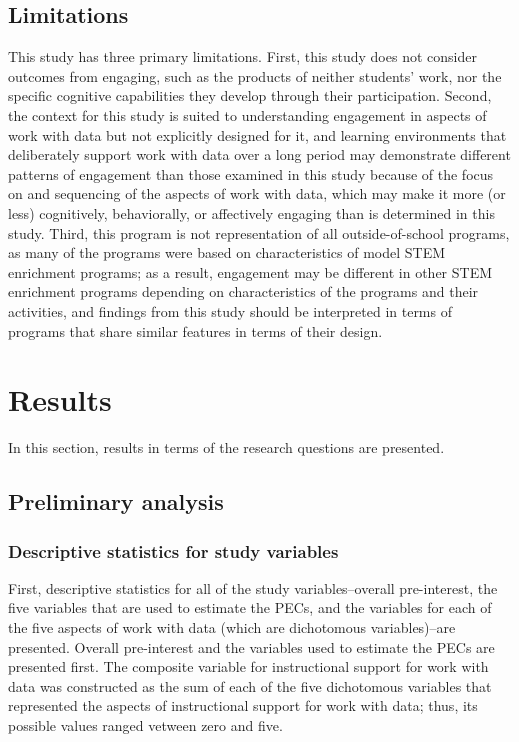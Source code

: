 \documentclass[]{msu-thesis}
\theoremstyle{definition}
\theoremstyle{definition}
\theoremstyle{definition}
\theoremstyle{remark}
\begin{document}
\section{Limitations}\label{limitations}

This study has three primary limitations. First, this study does not
consider outcomes from engaging, such as the products of neither
students' work, nor the specific cognitive capabilities they develop
through their participation. Second, the context for this study is
suited to understanding engagement in aspects of work with data but not
explicitly designed for it, and learning environments that deliberately
support work with data over a long period may demonstrate different
patterns of engagement than those examined in this study because of the
focus on and sequencing of the aspects of work with data, which may make
it more (or less) cognitively, behaviorally, or affectively engaging
than is determined in this study. Third, this program is not
representation of all outside-of-school programs, as many of the
programs were based on characteristics of model STEM enrichment
programs; as a result, engagement may be different in other STEM
enrichment programs depending on characteristics of the programs and
their activities, and findings from this study should be interpreted in
terms of programs that share similar features in terms of their design.

\chapter{Results}\label{results}

In this section, results in terms of the research questions are
presented.

\section{Preliminary analysis}\label{preliminary-analysis}

\subsection{Descriptive statistics for study
variables}\label{descriptive-statistics-for-study-variables}

First, descriptive statistics for all of the study variables--overall
pre-interest, the five variables that are used to estimate the PECs, and
the variables for each of the five aspects of work with data (which are
dichotomous variables)--are presented. Overall pre-interest and the
variables used to estimate the PECs are presented first. The composite
variable for instructional support for work with data was constructed as
the sum of each of the five dichotomous variables that represented the
aspects of instructional support for work with data; thus, its possible
values ranged vetween zero and five.
\end{document}

